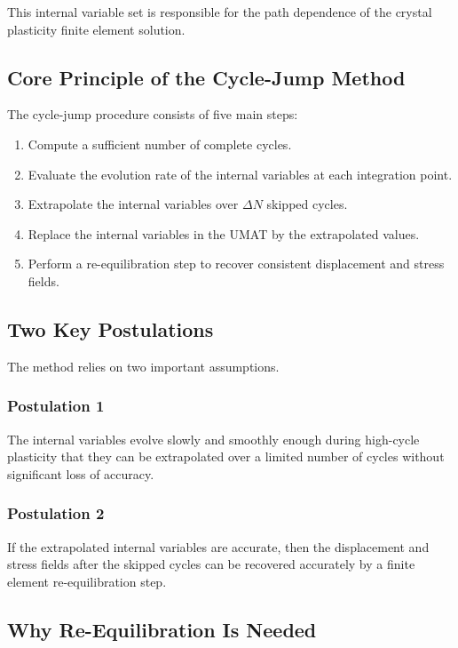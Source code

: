 ﻿\documentclass[11pt,a4paper]{article}
\begin{document}
This internal variable set is responsible for the path dependence of the crystal plasticity finite element solution.

\subsection{Core Principle of the Cycle-Jump Method}

The cycle-jump procedure consists of five main steps:

\begin{enumerate}[leftmargin=*]
    \item Compute a sufficient number of complete cycles.
    \item Evaluate the evolution rate of the internal variables at each integration point.
    \item Extrapolate the internal variables over $\Delta N$ skipped cycles.
    \item Replace the internal variables in the UMAT by the extrapolated values.
    \item Perform a re-equilibration step to recover consistent displacement and stress fields.
\end{enumerate}

\subsection{Two Key Postulations}

The method relies on two important assumptions.

\subsubsection*{Postulation 1}

The internal variables evolve slowly and smoothly enough during high-cycle plasticity that they can be extrapolated over a limited number of cycles without significant loss of accuracy.

\subsubsection*{Postulation 2}

If the extrapolated internal variables are accurate, then the displacement and stress fields after the skipped cycles can be recovered accurately by a finite element re-equilibration step.

\subsection{Why Re-Equilibration Is Needed}
\end{document}
